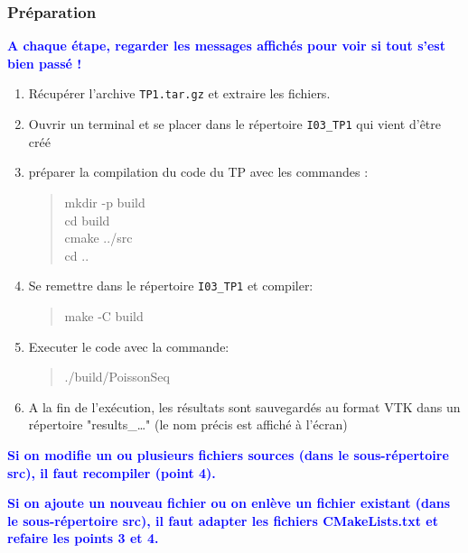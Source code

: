 \documentclass{beamer}
\begin{document}
\begin{frame}
\frametitle{Pr\'eparation}
	
	\vfill
	\textcolor{blue}{\bf A chaque \'etape, regarder les messages affich\'es pour voir si tout s'est bien pass\'e !}
	\vfill

	\begin{enumerate}
		\item R\'ecup\'erer l'archive {\tt TP1.tar.gz} et extraire les fichiers.
		\item Ouvrir un terminal et se placer dans le r\'epertoire {\tt I03\_TP1} qui vient d'\^etre cr\'e\'e
		\item préparer la compilation du code du TP avec les commandes :
		\begin{quote}
			mkdir -p build\\
			cd build\\
			cmake ../src\\
			cd ..
		\end{quote}
		\item Se remettre dans le r\'epertoire {\tt I03\_TP1} et compiler:
		\begin{quote}
			make -C build
		\end{quote}
	\end{enumerate}
	\vfill
	
\end{frame}
\begin{frame}
	\begin{enumerate}
  		\setcounter{enumi}{4}
		\item Executer le code avec la commande:
		\begin{quote}
			./build/PoissonSeq
		\end{quote}
		\item A la fin de l'exécution, les résultats sont sauvegardés au format VTK dans un répertoire "results\_\ldots" (le nom précis est affiché à l'écran)
	\end{enumerate}

\vfill
\textcolor{blue}{\bf Si on modifie un ou plusieurs fichiers sources (dans le sous-r\'epertoire src), il faut recompiler (point 4).}
\vfill

\textcolor{blue}{\bf Si on ajoute un nouveau fichier ou on enl\`eve un fichier existant (dans le sous-r\'epertoire src), il faut adapter les fichiers CMakeLists.txt et refaire les points 3 et 4.}
\vfill

\end{frame}
\end{document}
